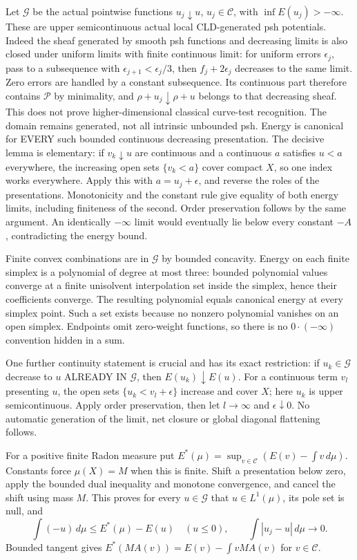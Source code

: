 \documentclass[11pt]{article}
\begin{document}
Let $\mathcal G$ be the actual pointwise functions $u_j\downarrow u$, $u_j\in\mathcal C$, with $\inf E(u_j)>-\infty$. These are upper semicontinuous actual local CLD-generated psh potentials. Indeed the sheaf generated by smooth psh functions and decreasing limits is also closed under uniform limits with finite continuous limit: for uniform errors $\epsilon_j$, pass to a subsequence with $\epsilon_{j+1}<\epsilon_j/3$, then $f_j+2\epsilon_j$ decreases to the same limit. Zero errors are handled by a constant subsequence. Its continuous part therefore contains $\mathscr P$ by minimality, and $\rho+u_j\downarrow\rho+u$ belongs to that decreasing sheaf. This does not prove higher-dimensional classical curve-test recognition. The domain remains generated, not all intrinsic unbounded psh. Energy is canonical for EVERY such bounded continuous decreasing presentation. The decisive lemma is elementary: if $v_k\downarrow u$ are continuous and a continuous $a$ satisfies $u<a$ everywhere, the increasing open sets $\{v_k<a\}$ cover compact $X$, so one index works everywhere. Apply this with $a=u_j+\epsilon$, and reverse the roles of the presentations. Monotonicity and the constant rule give equality of both energy limits, including finiteness of the second. Order preservation follows by the same argument. An identically $-\infty$ limit would eventually lie below every constant $-A$, contradicting the energy bound.

Finite convex combinations are in $\mathcal G$ by bounded concavity. Energy on each finite simplex is a polynomial of degree at most three: bounded polynomial values converge at a finite unisolvent interpolation set inside the simplex, hence their coefficients converge. The resulting polynomial equals canonical energy at every simplex point. Such a set exists because no nonzero polynomial vanishes on an open simplex. Endpoints omit zero-weight functions, so there is no $0\cdot(-\infty)$ convention hidden in a sum.

One further continuity statement is crucial and has its exact restriction: if $u_k\in\mathcal G$ decrease to $u$ ALREADY IN $\mathcal G$, then $E(u_k)\downarrow E(u)$. For a continuous term $v_l$ presenting $u$, the open sets $\{u_k<v_l+\epsilon\}$ increase and cover $X$; here $u_k$ is upper semicontinuous. Apply order preservation, then let $l\to\infty$ and $\epsilon\downarrow0$. No automatic generation of the limit, net closure or global diagonal flattening follows.

For a positive finite Radon measure put $E^*(\mu)=\sup_{v\in\mathcal C}(E(v)-\int v\,d\mu)$. Constants force $\mu(X)=M$ when this is finite. Shift a presentation below zero, apply the bounded dual inequality and monotone convergence, and cancel the shift using mass $M$. This proves for every $u\in\mathcal G$ that $u\in L^1(\mu)$, its pole set is null, and
\[
 \int(-u)\,d\mu\le E^*(\mu)-E(u)\quad(u\le0),\qquad
 \int|u_j-u|\,d\mu\longrightarrow0.
\]
Bounded tangent gives $E^*(MA(v))=E(v)-\int vMA(v)$ for $v\in\mathcal C$.
\end{document}
